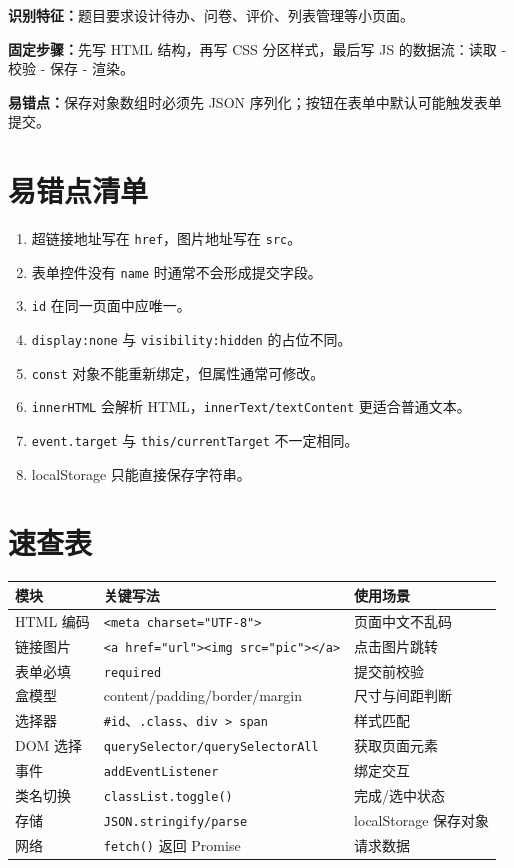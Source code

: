 \documentclass[UTF8,zihao=-4]{ctexart}
\begin{document}
\begin{methodbox}
\textbf{识别特征：}题目要求设计待办、问卷、评价、列表管理等小页面。\par
\textbf{固定步骤：}先写 HTML 结构，再写 CSS 分区样式，最后写 JS 的数据流：读取 - 校验 - 保存 - 渲染。\par
\textbf{易错点：}保存对象数组时必须先 JSON 序列化；按钮在表单中默认可能触发表单提交。
\end{methodbox}

\section{易错点清单}
\begin{warnbox}[常见扣分点]
\begin{enumerate}
  \item 超链接地址写在 \texttt{href}，图片地址写在 \texttt{src}。
  \item 表单控件没有 \texttt{name} 时通常不会形成提交字段。
  \item \texttt{id} 在同一页面中应唯一。
  \item \texttt{display:none} 与 \texttt{visibility:hidden} 的占位不同。
  \item \texttt{const} 对象不能重新绑定，但属性通常可修改。
  \item \texttt{innerHTML} 会解析 HTML，\texttt{innerText/textContent} 更适合普通文本。
  \item \texttt{event.target} 与 \texttt{this/currentTarget} 不一定相同。
  \item localStorage 只能直接保存字符串。
\end{enumerate}
\end{warnbox}

\section{速查表}
\begin{longtable}{p{}p{}p{}}
\toprule
\textbf{模块} & \textbf{关键写法} & \textbf{使用场景} \\
\midrule
HTML 编码 & \texttt{<meta charset="UTF-8">} & 页面中文不乱码 \\
链接图片 & \texttt{<a href="url"><img src="pic"></a>} & 点击图片跳转 \\
表单必填 & \texttt{required} & 提交前校验 \\
盒模型 & content/padding/border/margin & 尺寸与间距判断 \\
选择器 & \texttt{\#id}、\texttt{.class}、\texttt{div > span} & 样式匹配 \\
DOM 选择 & \texttt{querySelector/querySelectorAll} & 获取页面元素 \\
事件 & \texttt{addEventListener} & 绑定交互 \\
类名切换 & \texttt{classList.toggle()} & 完成/选中状态 \\
存储 & \texttt{JSON.stringify/parse} & localStorage 保存对象 \\
网络 & \texttt{fetch()} 返回 Promise & 请求数据 \\
\bottomrule
\end{longtable}
\end{document}
